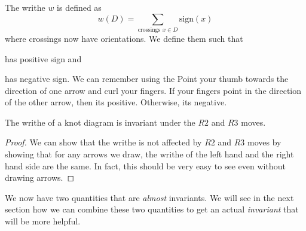\documentclass{article}
\begin{document}
\begin{definition}
    The writhe $w$ is defined as
    \begin{equation}
        w(D) = \sum_\text{crossings $x\in D$} \text{sign}(x)
    \end{equation} 
    where crossings now have orientations. We define them such that
    \begin{center}
    \end{center}
    has positive sign and
    \begin{center}
    \end{center}
    has negative sign. We can remember using the  Point your thumb towards the direction of one arrow and curl your fingers. If your fingers point in the direction of the other arrow, then its positive. Otherwise, its negative. 
\end{definition}
\begin{theorem}
    The writhe of a knot diagram is invariant under the $R2$ and $R3$ moves.
\end{theorem}
\begin{proof}
    We can show that the writhe is not affected by $R2$ and $R3$ moves by showing that for any arrows we draw, the writhe of the left hand and the right hand side are the same. In fact, this should be very easy to see even without drawing arrows.
\end{proof}
We now have two quantities that are \textit{almost} invariants. We will see in the next section how we can combine these two quantities to get an actual \textit{invariant} that will be more helpful.

\newpage
\end{document}
